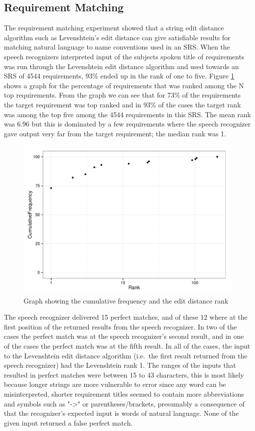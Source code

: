\FloatBarrier

\subsection{Requirement Matching}
\label{sub:reqmatch}
The requirement matching experiment showed that a string edit distance algorithm such as Levenshtein's edit distance can give satisfiable results for matching natural language to name conventions used in an SRS. When the speech recognizers interpreted input of the subjects spoken title of requirements was run through the Levenshtein edit distance algorithm and used towards an SRS of 4544 requirements, 93\% ended up in the rank of one to five. Figure \ref{fig:freqperrank} shows a graph for the percentage of requirements that was ranked among the N top requirements. From the graph we can see that for 73\% of the requirements the target requirement was top ranked and in 93\% of the cases the target rank was among the top five among the 4544 requirements in this SRS.
The mean rank was $6.96$ but this is dominated by a few requirements where the speech recognizer gave output very far from the target requirement; the median rank was 1.


\begin{figure}[h]
\centering
\includegraphics[width = 350pt, keepaspectratio = true]{fig/freqperrank}
\caption{Graph showing the cumulative frequency and the edit distance rank}
\label{fig:freqperrank}
\end{figure}

The speech recognizer delivered 15 perfect matches, and of these 12 where at the first position of the returned results from the speech recognizer. In two of the cases the perfect match was at the speech recognizer's second result, and in one of the cases the perfect match was at the fifth result. In all of the cases, the input to the Levenshtein edit distance algorithm (i.e.\ the first result returned from the speech recognizer) had the Levenshtein rank 1. The ranges of the inputs that resulted in perfect matches were between 15 to 43 characters, this is most likely because longer strings are more vulnerable to error since any word can be misinterpreted, shorter requirement titles seemed to contain more abbreviations and symbols such as "->" or parentheses/brackets, presumably a consequence of that the recognizer's expected input is words of natural language. None of the given input returned a false perfect match.


